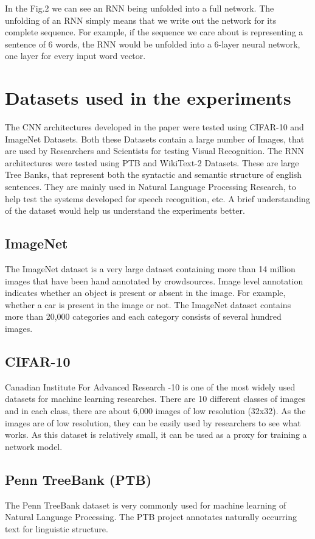 \documentclass{ieee}
\begin{document}
In the Fig.2 we can see an RNN being unfolded into a full network. The unfolding of an RNN simply means that we write out the network for its complete sequence. For example, if the sequence we care about is representing a sentence of 6 words, the RNN would be unfolded into a 6-layer neural network, one layer for every input word vector.

\section{Datasets used in the experiments}
The CNN architectures developed in the paper were tested using CIFAR-10 and ImageNet Datasets. Both these Datasets contain a large number of Images, that are used by Researchers and Scientists for testing Visual Recognition.  The RNN architectures were tested using PTB and WikiText-2 Datasets. These are large Tree Banks, that represent both the syntactic and semantic structure of english sentences. They are mainly used in Natural Language Processing Research, to help test the systems developed for speech recognition, etc. A brief understanding of the dataset would help us understand the experiments better.
\subsection{ImageNet}
The ImageNet dataset is a very large dataset containing more than 14 million images that have been hand annotated by crowdsources. Image level annotation indicates whether an object is present or absent in the image. For example, whether a car is present in the image or not. The ImageNet dataset contains more than 20,000 categories and each category consists of several hundred images.
\subsection{CIFAR-10}
Canadian Institute For Advanced Research -10 is one of the most widely used datasets for machine learning researches. There are 10 different classes of images and in each class, there are about 6,000 images of low resolution (32x32). As the images are of low resolution, they can be easily used by researchers to see what works. As this dataset is relatively small, it can be used as a proxy for training a network model.
\subsection{Penn TreeBank (PTB)}
The Penn TreeBank dataset is very commonly used for machine learning of Natural Language Processing. The PTB project annotates naturally occurring text for linguistic structure.
\end{document}
